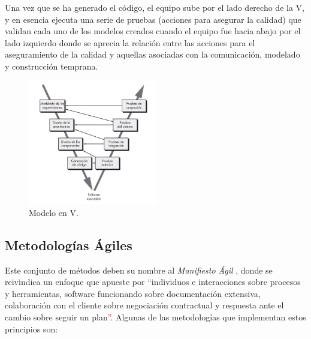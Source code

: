 \begin{itemize}
        Una vez que se ha generado el código, el equipo sube por el lado derecho de la V, y en esencia ejecuta una serie de pruebas (acciones para asegurar la calidad) que validan cada uno de los modelos creados cuando el equipo fue hacia abajo por el lado izquierdo donde se aprecia la relación entre las acciones para  el aseguramiento de la calidad y aquellas asociadas con la comunicación, modelado y construcción temprana. 
    
        \begin{figure}[h]
            \centering
            \includegraphics[width=0.5\textwidth]{figures/en v.JPG}
            \caption[Modelo en V, extraído de \cite{pressman_software_2005}]{Modelo en V.}
            \label{fig:metodologia:modelo_v}
        \end{figure}
    \end{itemize}

    \subsection{Metodologías Ágiles}

        Este conjunto de métodos deben su nombre al \textit{Manifiesto Ágil} \cite{varios_autores_manifiesto_2001}, donde se reivindica un enfoque que apueste por ``individuos e interacciones sobre procesos y herramientas, software funcionando sobre documentación extensiva, colaboración con el cliente sobre negociación contractual y respuesta ante el cambio sobre seguir un plan\textcolor{red}{''}. %
        Algunas de las metodologías que implementan estos principios son:
    

